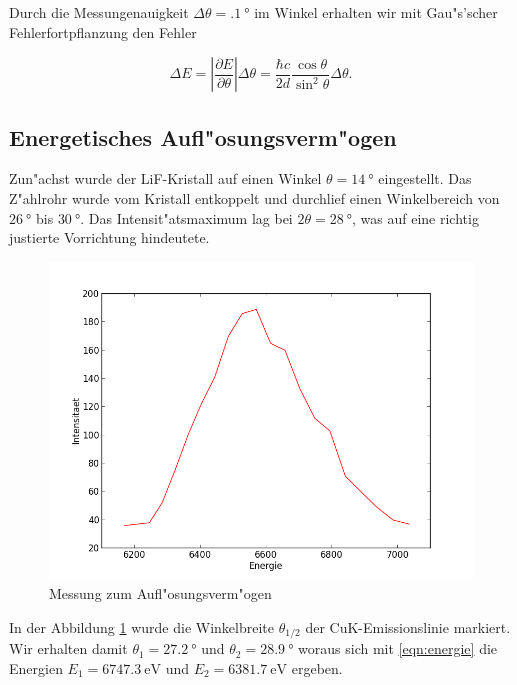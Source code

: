 	Durch die Messungenauigkeit $\Delta \theta = \SI{.1}{\degree}$ im Winkel erhalten wir mit Gau"s'scher Feh\-ler\-fort\-pflanz\-ung den Fehler

	\begin{equation}
		\Delta E = \left| \frac{\partial E}{\partial \theta} \right| \Delta \theta = 
		\frac{\hbar c}{2 d} \frac{\cos{\theta}}{\sin^2{\theta}} \Delta \theta . \nonumber
	\end{equation}

	\subsection{Energetisches Aufl"osungsverm"ogen}
		\label{subsec:aufloesung}

		Zun"achst wurde der LiF-Kristall auf einen Winkel $\theta = \SI{14}{\degree}$ eingestellt.
		Das Z"ahlrohr wurde vom Kristall entkoppelt und durchlief einen Winkelbereich von $\SI{26}{\degree}$ bis $\SI{30}{\degree}$.
		Das Intensit"atsmaximum lag bei $2\theta = \SI{28}{\degree}$, was auf eine richtig justierte Vorrichtung hin\-deu\-te\-te.

		\begin{figure}[h!]
			\centering
			\includegraphics[width = 15cm]{fits/graph_adjust.png}
			\caption{Messung zum Aufl"osungsverm"ogen}
			\label{fig:aufloesung}
		\end{figure}

		In der Abbildung \ref{fig:aufloesung} wurde die Winkelbreite $\theta_{1/2}$ der CuK-Emissionslinie markiert.
		Wir erhalten damit $\theta_1 = \SI{27.2}{\degree}$ und $\theta_2 = \SI{28.9}{\degree}$ woraus sich mit \eqref{eqn:energie} die Energien $E_1 = \SI{6747.3}{\electronvolt}$ und $E_2 = \SI{6381.7}{\electronvolt}$ ergeben.

